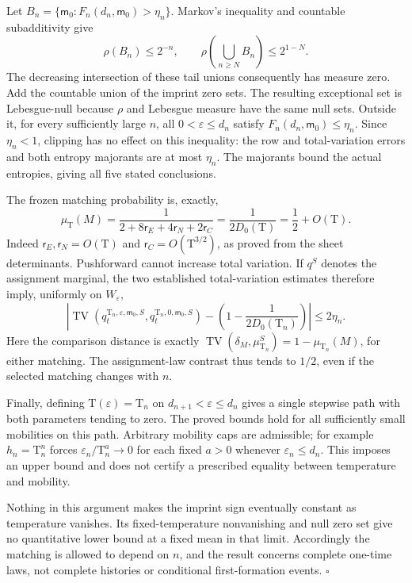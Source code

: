 Let \(B_n=\{\mathsf m_0:F_n(d_n,\mathsf m_0)>\eta_n\}\).
Markov's inequality and countable subadditivity give
\[
 \rho(B_n)\le2^{-n},
 \qquad
 \rho\left(\bigcup_{n\ge N}B_n\right)\le2^{1-N}.
\]
The decreasing intersection of these tail unions consequently has
measure zero. Add the countable union of the imprint zero sets. The
resulting exceptional set is Lebesgue-null because \(\rho\) and Lebesgue
measure have the same null sets. Outside it, for every sufficiently large
\(n\), all \(0<\varepsilon\le d_n\) satisfy
\(F_n(d_n,\mathsf m_0)\le\eta_n\). Since \(\eta_n<1\), clipping has
no effect on this inequality: the row and total-variation errors and both entropy majorants are at
most \(\eta_n\). The majorants bound the actual entropies, giving
all five stated conclusions.

The frozen matching probability is, exactly,
\[
 \mu_{\mathrm T}(M)
 =\frac1{2+8\mathsf r_E+4\mathsf r_N+2\mathsf r_C}
 =\frac1{2D_0(\mathrm T)}
 =\frac12+O(\mathrm T).
\]
Indeed \(\mathsf r_E,\mathsf r_N=O(\mathrm T)\) and
\(\mathsf r_C=O(\mathrm T^{3/2})\), as proved from the sheet
determinants. Pushforward cannot increase total variation. If
\(q^{S}\) denotes the assignment marginal, the two established
total-variation estimates therefore imply, uniformly on \(W_\varepsilon\),
\[
 \left|
 \operatorname{TV}
 (q_t^{\mathrm T_n,\varepsilon,\mathsf m_0,S},
                  q_t^{\mathrm T_n,0,\mathsf m_0,S})
 -\left(1-\frac1{2D_0(\mathrm T_n)}\right)
 \right|\le2\eta_n.
\]
Here the comparison distance is exactly
\(\operatorname{TV}(\delta_M,\mu_{\mathrm T_n}^S)
=1-\mu_{\mathrm T_n}(M)\), for either matching.
The assignment-law contrast thus tends to \(1/2\), even if the selected
matching changes with \(n\).

Finally, defining \(\mathrm T(\varepsilon)=\mathrm T_n\) on
\(d_{n+1}<\varepsilon\le d_n\) gives a single stepwise path with both
parameters tending to zero. The proved bounds hold for all sufficiently
small mobilities on this path. Arbitrary mobility caps are admissible;
for example \(h_n=\mathrm T_n^n\) forces
\(\varepsilon_n/\mathrm T_n^a\to0\) for each fixed \(a>0\) whenever
\(\varepsilon_n\le d_n\). This imposes an upper bound and does not certify
a prescribed equality between temperature and mobility.

Nothing in this argument makes the imprint sign eventually constant as
temperature vanishes. Its fixed-temperature nonvanishing and null zero
set give no quantitative lower bound at a fixed mean in that limit.
Accordingly the matching is allowed to depend on \(n\), and the result
concerns complete one-time laws, not complete histories or conditional
first-formation events. \(\square\)




